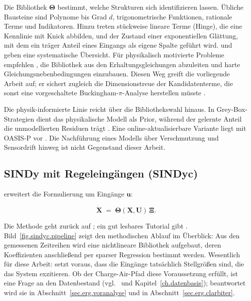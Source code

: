 \label{ssec.sot.sindy.bib}

Die Bibliothek $\boldsymbol\Theta$ bestimmt, welche Strukturen sich
identifizieren lassen. Übliche Bausteine sind Polynome bis Grad $d$,
trigonometrische Funktionen, rationale Terme und Indikatoren. Hinzu treten
stückweise lineare Terme (Hinge), die eine Kennlinie mit Knick abbilden,
und der Zustand einer exponentiellen Glättung, mit dem ein träger Anteil
eines Eingangs als eigene Spalte geführt wird.
\cite[Kap.~2]{bruntonDataDrivenScience2017} und
\cite{desilvaPySINDyPythonPackage2020} geben eine systematische Übersicht.
Für physikalisch motivierte Probleme empfehlen
\cite{loiseauConstrainedSparseGalerkin2018}, die Bibliothek aus den
Erhaltungsgleichungen abzuleiten und harte Gleichungsnebenbedingungen
einzubauen. Diesen Weg greift die vorliegende Arbeit auf; er sichert
zugleich die Dimensionstreue der Kandidatenterme, die sonst eine
vorgeschaltete Buckingham-$\pi$-Analyse herstellen müsste
\cite{wulffPhysicsinformedRegressionModels2025}.


Die physik-informierte Linie reicht über die Bibliothekswahl hinaus. In
Grey-Box-Strategien dient das physikalische Modell als Prior, während der
gelernte Anteil die unmodellierten Residuen trägt
\cite{subramanianWhiteboxMachineLearning2021,
ellisMachineLearningEnhanced2021}. Eine online-aktualisierbare Variante
liegt mit OASIS-P vor \cite{bhadrirajuOASISPOperableAdaptive2021}. Die
Nachführung eines Modells über Verschmutzung und Sensordrift hinweg ist
nicht Gegenstand dieser Arbeit.


\subsection{SINDy mit Regeleingängen (SINDyc)}
\label{ssec.sot.sindyc}

\sindyc{} erweitert die Formulierung um Eingänge $\mathbf u$:

\begin{equation}
  \label{eq.sindyc.def}
  \dot{\mathbf X} \;=\; \boldsymbol\Theta(\mathbf X, \mathbf U)\,\boldsymbol\Xi.
\end{equation}

Die Methode geht zurück auf
\cite{bruntonSparseIdentificationNonlinear2016}; ein gut lesbares
Tutorial gibt \cite{faselSINDyControlTutorial2021}.
Bild~\ref{fig.sindyc.pipeline} zeigt den methodischen Ablauf im
Überblick: Aus den gemessenen Zeitreihen wird eine nichtlineare
Bibliothek aufgebaut, deren Koeffizienten anschließend per sparser
Regression bestimmt werden. Wesentlich für diese Arbeit: \sindyc{} setzt
voraus, dass die Eingänge tatsächlich Stellgrößen sind, die das System
exzitieren. Ob der Charge-Air-Pfad diese Voraussetzung erfüllt, ist eine
Frage an den Datenbestand (vgl.\
\cite{boddupalliKoopmanOperatorsGeneralized2019} und
Kapitel~\ref{ch.datenbasis}); beantwortet wird sie in
Abschnitt~\ref{sec.erg.voranalyse} und in
Abschnitt~\ref{sec.erg.clarbiter}.

